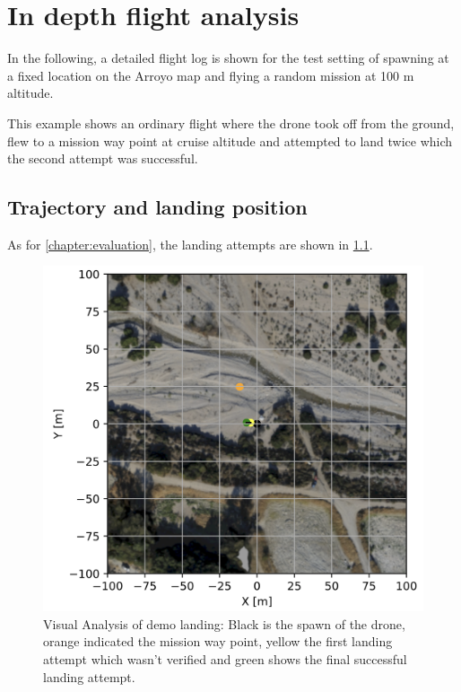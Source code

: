 \chapter{In depth flight analysis}
\label{sec:specific_runs}

In the following, a detailed flight log is shown for the test setting of spawning at a fixed location on the Arroyo map and flying a random mission at 100 m altitude.

This example shows an ordinary flight where the drone took off from the ground, flew to a mission way point at cruise altitude and attempted to land twice which the second attempt was successful.

\section{Trajectory and landing position}

As for \cref{chapter:evaluation}, the landing attempts are shown in \cref{fig:demo_run_landing}.

\begin{figure}[h]
\centering
\includegraphics[scale=0.45]{images/appendix/run_analysis/demo_run.png}
\caption{Visual Analysis of demo landing: Black is the spawn of the drone, orange indicated the mission way point, yellow the first landing attempt which wasn't verified and green shows the final successful landing attempt.}
\label{fig:demo_run_landing}
\end{figure}

